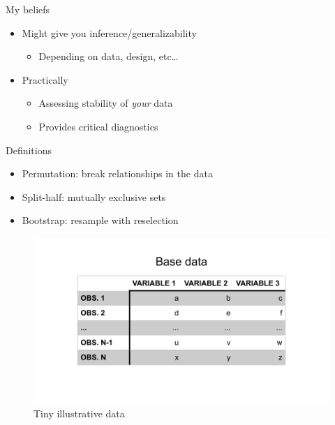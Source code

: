 \documentclass[
  ignorenonframetext,
]{beamer}
\providecommand{\tightlist}{%
  \setlength{\itemsep}{0pt}\setlength{\parskip}{0pt}}
\begin{document}
\begin{frame}{My beliefs}
\protect\hypertarget{my-beliefs}{}

\begin{itemize}[<+->]
\tightlist
\item
  Might give you inference/generalizability

  \begin{itemize}[<+->]
  \tightlist
  \item
    Depending on data, design, etc\ldots{}
  \end{itemize}
\item
  Practically

  \begin{itemize}[<+->]
  \tightlist
  \item
    Assessing stability of \emph{your} data
  \item
    Provides critical diagnostics
  \end{itemize}
\end{itemize}

\end{frame}

\begin{frame}{Definitions}
\protect\hypertarget{definitions-1}{}

\begin{itemize}[<+->]
\tightlist
\item
  Permutation: break relationships in the data
\item
  Split-half: mutually exclusive sets
\item
  Bootstrap: resample with reselection
\end{itemize}

\end{frame}

\begin{frame}

\begin{figure}
\centering
\includegraphics{../Images/base_data.png}
\caption{Tiny illustrative data}
\end{figure}

\end{frame}
\end{document}
